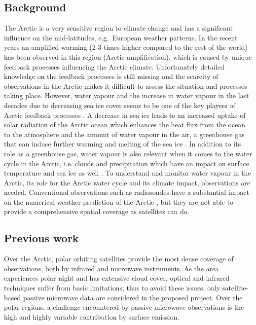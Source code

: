 \documentclass[12pt,oneside,a4paper]{article}
\begin{document}
\subsection{Background}
%
\label{sec:background}
The Arctic is a very sensitive region to climate change and has a significant
influence on the mid-latitudes, e.g.\ European weather patterns. In the recent
years an amplified warming (2-3 times higher compared to the rest of the world)
has been observed in this region (Arctic amplification), which is caused by
unique feedback processes influencing the Arctic climate. Unfortunately
detailed knowledge on the feedback processes is still missing and the scarcity
of observations in the Arctic makes it difficult to assess the situation and
processes taking place. However, water vapour and the increase in water vapour
in the last decades due to decreasing sea ice cover seems to be one of the key
players of Arctic feedback processes \citep[e.g.][]{ vihma:2016:theat}. A decrease in sea ice leads to an increased uptake of solar
radiation of the Arctic ocean which enhances the heat flux from the ocean to
the atmosphere and the amount of water vapour in the air, a greenhouse gas that
can induce further warming and melting of the sea ice \citep{screen:2010:thece}. In
addition to its role as a greenhouse gas, water vapour is also relevant when it
comes to the water cycle in the Arctic, i.e. clouds and precipitation which
have an impact on surface temperature and sea ice as well
\citep{blanchet:water:1995}. To understand and monitor water vapour in the
Arctic, its role for the Arctic water cycle and its climate impact,  observations
are needed. Conventional observations such as radiosondes have a substantial
impact on the numerical weather prediction of the Arctic
\citep{lawrence:2019:usean}, but they are not able to provide a comprehensive
spatial coverage as satellites can do.

\subsection{Previous work}
%
\label{sec:previousworks}
%
Over the Arctic, polar orbiting satellites provide the most dense coverage
of observations, both by infrared and microwave instruments. As the area
experiences polar night and has extensive cloud cover, optical and infrared
techniques suffer from basic limitations; thus to avoid these issues, only
satellite-based passive microwave data are considered in the proposed project. Over the polar regions, a challenge encountered by passive microwave observations is the high and highly variable contribution by surface emission.
\end{document}
